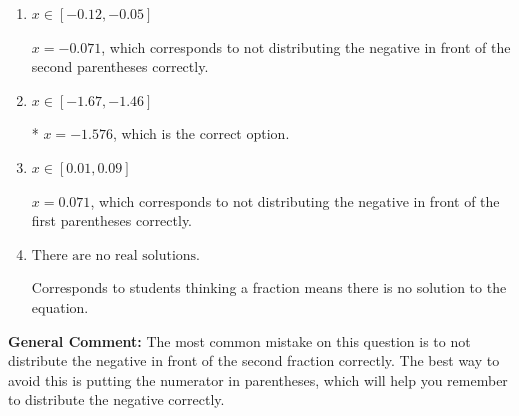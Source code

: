 \documentclass{extbook}[14pt]
\begin{document}
\begin{enumerate}
{\begin{enumerate}[label=\Alph*.]
$x = -0.133$, which corresponds to getting the negative of the actual solution.
\item \( x \in [-0.12, -0.05] \)

$x = -0.071$, which corresponds to not distributing the negative in front of the second parentheses correctly.
\item \( x \in [-1.67, -1.46] \)

* $x = -1.576$, which is the correct option.
\item \( x \in [0.01, 0.09] \)

$x = 0.071$, which corresponds to not distributing the negative in front of the first parentheses correctly.
\item \( \text{There are no real solutions.} \)

Corresponds to students thinking a fraction means there is no solution to the equation.
\end{enumerate}

\textbf{General Comment:} The most common mistake on this question is to not distribute the negative in front of the second fraction correctly. The best way to avoid this is putting the numerator in parentheses, which will help you remember to distribute the negative correctly.
}
\end{enumerate}
\end{document}
